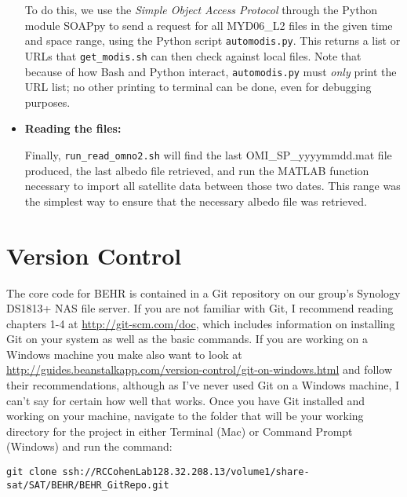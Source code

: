 \documentclass[12pt]{article}
\begin{document}
\begin{itemize}
			To do this, we use the \emph{Simple Object Access Protocol} through the Python module SOAPpy to send a request for all MYD06\_L2 files in the given time and space range, using the Python script \texttt{automodis.py}. This returns a list or URLs that \texttt{get\_modis.sh} can then check against local files.  Note that because of how Bash and Python interact, \texttt{automodis.py} must \emph{only} print the URL list; no other printing to terminal can be done, even for debugging purposes.
			
			\item \textbf{Reading the files:}
			
			Finally, \texttt{run\_read\_omno2.sh} will find the last OMI\_SP\_yyyymmdd.mat file produced, the last albedo file retrieved, and run the MATLAB function necessary to import all satellite data between those two dates. This range was the simplest way to ensure that the necessary albedo file was retrieved.
			
		\end{itemize}
		
		
		
\section{Version Control}\label{sec:version-control}
	
	The core code for BEHR is contained in a Git repository on our group's Synology DS1813+ NAS file server.  If you are not familiar with Git, I recommend reading chapters 1-4 at \url{http://git-scm.com/doc}, which includes information on installing Git on your system as well as the basic commands.  If you are working on a Windows machine you make also want to look at \url{http://guides.beanstalkapp.com/version-control/git-on-windows.html} and follow their recommendations, although as I've never used Git on a Windows machine, I can't say for certain how well that works.  
	Once you have Git installed and working on your machine, navigate to the folder that will be your working directory for the project in either Terminal (Mac) or Command Prompt (Windows) and run the command:

\vspace{12pt}
	\begin{sloppypar}
\noindent\texttt{git clone ssh://RCCohenLab\@128.32.208.13/volume1/share-sat/SAT/BEHR/BEHR\_GitRepo.git}
	\end{sloppypar}
	
\end{document}
